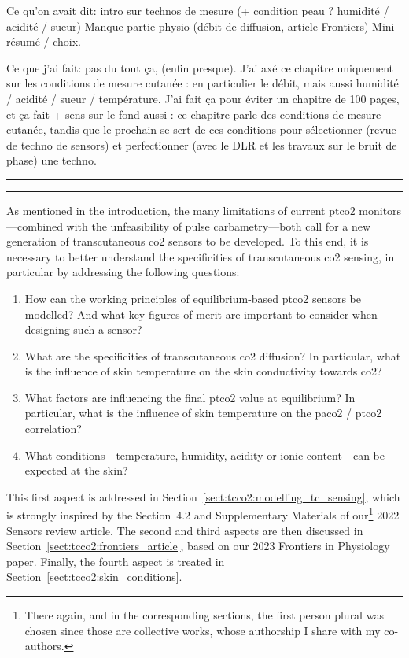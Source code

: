 Ce qu'on avait dit: intro sur technos de mesure (+ condition peau ? humidité / acidité / sueur)
Manque partie physio (débit de diffusion, article Frontiers)
Mini résumé / choix.

Ce que j'ai fait: pas du tout ça, (enfin presque). J'ai axé ce chapitre uniquement sur les conditions de mesure cutanée : en particulier le débit, mais aussi humidité / acidité / sueur / température. J'ai fait ça pour éviter un chapitre de 100 pages, et ça fait + sens sur le fond aussi : ce chapitre parle des conditions de mesure cutanée, tandis que le prochain se sert de ces conditions pour sélectionner (revue de techno de sensors) et perfectionner (avec le DLR et les travaux sur le bruit de phase) une techno.

\vspace{.3cm}\hrule\vspace{.1cm}\hrule\vspace{.3cm}

As mentioned in \hyperref[chap:intro]{the introduction}, the many limitations of current \gls{ptco2} monitors---com\-bined with the unfeasibility of pulse carbametry---both call for a new generation of transcutaneous \gls{co2} sensors to be developed. To this end, it is necessary to better understand the specificities of transcutaneous \gls{co2} sensing, in particular by addressing the following questions:
\begin{enumerate}
	\item How can the working principles of equilibrium-based \gls{ptco2} sensors be modelled? And what key figures of merit are important to consider when designing such a sensor?
	\item What are the specificities of transcutaneous \gls{co2} diffusion? In particular, what is the influence of skin temperature on the skin conductivity towards \gls{co2}?
	\item What factors are influencing the final \gls{ptco2} value at equilibrium? In particular, what is the influence of skin temperature on the \gls{paco2} / \gls{ptco2} correlation?
	\item What conditions---temperature, humidity, acidity or ionic content---can be expected at the skin?
\end{enumerate}

This first aspect is addressed in Section~\ref{sect:tcco2:modelling_tc_sensing}, which is strongly inspired by the Section~4.2 and Supplementary Materials of our\footnote{There again, and in the corresponding sections, the first person plural was chosen since those are collective works, whose authorship I share with my co-authors.} 2022 Sensors review article\cite{dervieux2022}. The second and third aspects are then discussed in Section~\ref{sect:tcco2:frontiers_article}, based on our 2023 Frontiers in Physiology paper\cite{dervieux2023rate}. Finally, the fourth aspect is treated in Section~\ref{sect:tcco2:skin_conditions}.

